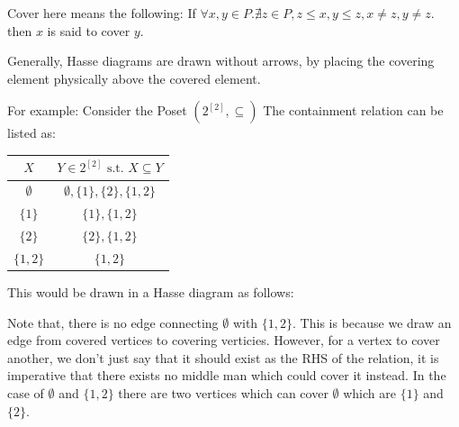 Cover here means the following:
If $\forall x, y \in P. \nexists z \in P, z \leq x, y \leq z, x \neq
z, y \neq z.$ then $x$ is said to cover $y$.

Generally, Hasse diagrams are drawn without arrows, by placing the
covering element physically above the covered element.

For example:
Consider the Poset $(2^{[2]}, \subseteq)$
The containment relation can be listed as:

\begin{center}
  \begin{tabular}{ |c|c| }
    \hline
    $X$ & $Y \in 2^{[2]} \text{ s.t. } X \subseteq Y$\\
    \hline
    $\emptyset$ & $\emptyset, \{1\}, \{2\}, \{1, 2\}$\\
    $\{1\}$ & $\{1\}, \{1, 2\}$\\
    $\{2\}$ & $\{2\}, \{1, 2\}$\\
    $\{1, 2\}$ & $\{1, 2\}$\\
    \hline
  \end{tabular}
\end{center}

This would be drawn in a Hasse diagram as follows:

\begin{tcolorbox}[colframe=orange!50, title = Hasse diagram of $2^X$]
  \begin{center}
  \end{center}
  \tcblower
  Note that, there is no edge connecting $\emptyset$ with $\{1, 2\}$.
  This is because we draw an edge from
  covered vertices to covering verticies. However, for a vertex to
  cover another, we don't just say that
  it should exist as the RHS of the relation, it is imperative that
  there exists no middle man
  which could cover it instead. In the case of $\emptyset$ and $\{1,
  2\}$ there are two vertices which can
  cover $\emptyset$ which are $\{1\}$ and $\{2\}$.
\end{tcolorbox}

